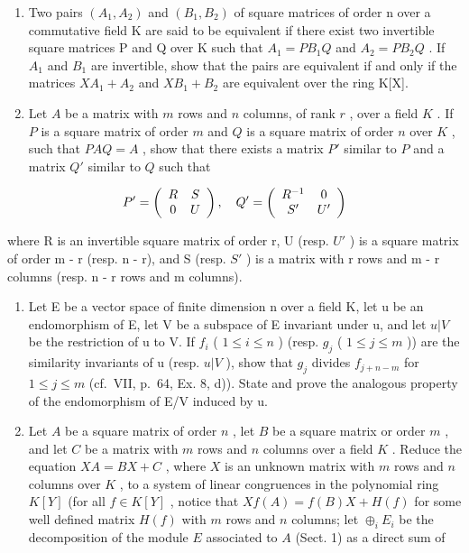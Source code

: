 \begin{enumerate}
\def\labelenumi{\arabic{enumi})}
\setcounter{enumi}{5}
\item
  Two pairs \((A_{1}, A_{2})\) and \((B_{1}, B_{2})\) of square matrices of order n over a commutative field K are said to be equivalent if there exist two invertible square matrices P and Q over K such that \(A_{1} = PB_{1}Q\) and \(A_{2} = PB_{2}Q\) . If \(A_{1}\) and \(B_{1}\) are invertible, show that the pairs are equivalent if and only if the matrices \(XA_{1} + A_{2}\) and \(XB_{1} + B_{2}\) are equivalent over the ring K{[}X{]}.
\item
  Let \(A\) be a matrix with \(m\) rows and \(n\) columns, of rank \(r\) , over a field \(K\) . If \(P\) is a square matrix of order \(m\) and \(Q\) is a square matrix of order \(n\) over \(K\) , such that \(PAQ = A\) , show that there exists a matrix \(P'\) similar to \(P\) and a matrix \(Q'\) similar to \(Q\) such that
\end{enumerate}

\[
P ^ {\prime} = \left( \begin{array}{c c} R & S \\ 0 & U \end{array} \right), \quad Q ^ {\prime} = \left( \begin{array}{c c} R ^ {- 1} & 0 \\ S ^ {\prime} & U ^ {\prime} \end{array} \right)
\]

where R is an invertible square matrix of order r, U (resp. \(U'\) ) is a square matrix of order m - r (resp. n - r), and S (resp. \(S'\) ) is a matrix with r rows and m - r columns (resp. n - r rows and m columns).

\begin{enumerate}
\def\labelenumi{\arabic{enumi})}
\setcounter{enumi}{7}
\item
  Let E be a vector space of finite dimension n over a field K, let u be an endomorphism of E, let V be a subspace of E invariant under u, and let \(u|V\) be the restriction of u to V. If \(f_{i}\) ( \(1 \leqslant i \leqslant n\) ) (resp. \(g_{j}\) ( \(1 \leqslant j \leqslant m\) )) are the similarity invariants of u (resp. \(u|V\) ), show that \(g_{j}\) divides \(f_{j+n-m}\) for \(1 \leqslant j \leqslant m\) (cf.~VII, p.~64, Ex. 8, d)). State and prove the analogous property of the endomorphism of E/V induced by u.
\item
  Let \(A\) be a square matrix of order \(n\) , let \(B\) be a square matrix or order \(m\) , and let \(C\) be a matrix with \(m\) rows and \(n\) columns over a field \(K\) . Reduce the equation \(X A = B X + C\) , where \(X\) is an unknown matrix with \(m\) rows and \(n\) columns over \(K\) , to a system of linear congruences in the polynomial ring \(K[Y]\) (for all \(f \in K[Y]\) , notice that \(X f(A) = f(B)X + H(f)\) for some well defined matrix \(H(f)\) with \(m\) rows and \(n\) columns; let \(\oplus_{i} E_i\) be the decomposition of the module \(E\) associated to \(A\) (Sect. 1) as a direct sum of
\end{enumerate}

